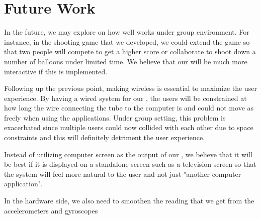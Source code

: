 \section{Future Work}
In the future, we may explore on how well \tube works under group environment. For instance, in the shooting game that we developed, we could extend the game so that two people will compete to get a higher score or collaborate to shoot down a number of balloons under limited time. We believe that our \tube will be much more interactive if this is implemented.

Following up the previous point, making \tube wireless is essential to maximize the user experience. By having a wired system for our \tube, the users will be constrained at how long the wire connecting the tube to the computer is and could not move as freely when using the applications. Under group setting, this problem is exacerbated since multiple users could now collided with each other due to space constraints and this will definitely detriment the user experience.

Instead of utilizing computer screen as the output of our \tube, we believe that it will be best if it is displayed on a standalone screen such as a television screen so that the \tube system will feel more natural to the user and not just "another computer application".

In the hardware side, we also need to smoothen the reading that we get from the accelerometers and gyroscopes

